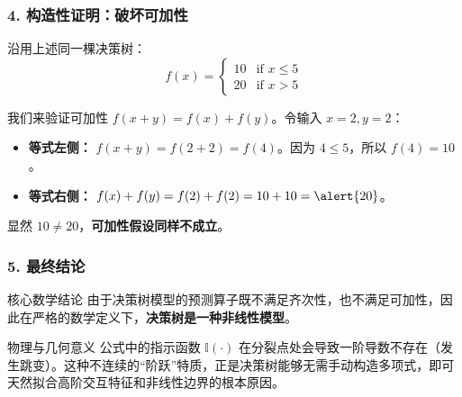 \documentclass{beamer}
\begin{document}
\begin{frame}
\frametitle{4. 构造性证明：破坏可加性}
沿用上述同一棵决策树：
\begin{equation*}
f(x) =
\begin{cases}
  10 & \text{if } x \leq 5 \\
  20 & \text{if } x > 5
\end{cases}
\end{equation*}

我们来验证可加性 $f(x + y) = f(x) + f(y)$。令输入 $x = 2, y = 2$：
\vspace{0.2cm}
\begin{itemize}
    \item \textbf{等式左侧：} $f(x + y) = f(2 + 2) = f(4)$。因为 $4 \leq 5$，所以 \alert{$f(4) = 10$}。
    \item \textbf{等式右侧：} $f(x) + f(y) = f(2) + f(2) = 10 + 10 = \alert{20}$。
\end{itemize}
\vspace{0.3cm}
显然 $10 \neq 20$，\textbf{可加性假设同样不成立}。
\end{frame}

\begin{frame}
\frametitle{5. 最终结论}
\begin{block}{核心数学结论}
由于决策树模型的预测算子既不满足齐次性，也不满足可加性，因此在严格的数学定义下，\textbf{决策树是一种非线性模型}。
\end{block}
\vspace{0.5cm}
\begin{block}{物理与几何意义}
公式中的指示函数 $\mathbb{I}(\cdot)$ 在分裂点处会导致一阶导数不存在（发生跳变）。这种不连续的“阶跃”特质，正是决策树能够无需手动构造多项式，即可天然拟合高阶交互特征和非线性边界的根本原因。
\end{block}
\end{frame}
\end{document}
